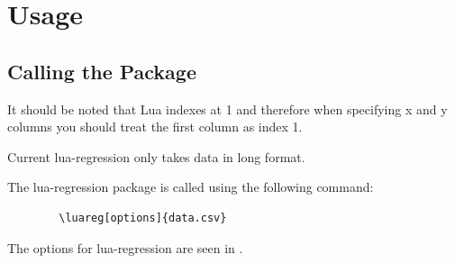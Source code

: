 \documentclass[11pt]{article}
\begin{document}
    \section{Usage}

    \subsection{Calling the Package}
    
    \begin{warningbox}
    	It should be noted that Lua indexes at 1 and therefore when specifying x and y columns you should treat the first column as index 1.
    \end{warningbox}
    
    \begin{warningbox}
    	Current {\ttfamily lua-regression} only takes data in long format.
    \end{warningbox}

    The {\ttfamily lua-regression} package is called using the following command:

	\begin{codebox}
    \begin{verbatim}
        \luareg[options]{data.csv}
    \end{verbatim}
    \end{codebox}

    
    The options for {\ttfamily lua-regression} are seen in .
\end{document}
